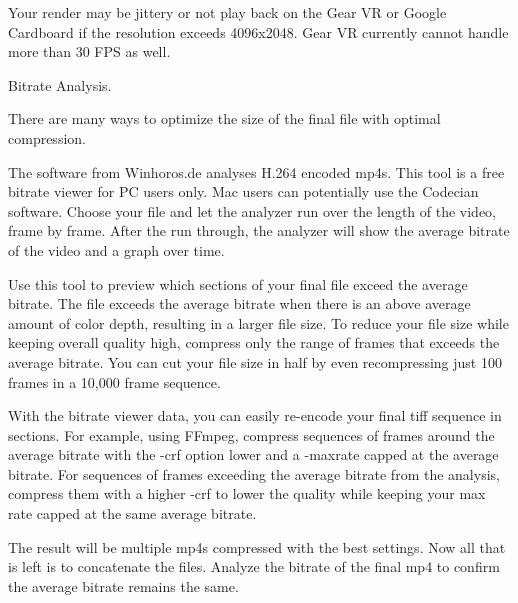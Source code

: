 \begin{fullwidth}
\tip Your render may be jittery or not play back on the Gear VR or Google Cardboard if the resolution exceeds 4096x2048. Gear VR currently cannot handle more than 30 FPS as well.

{\large Bitrate Analysis. \par}

There are many ways to optimize the size of the final file with optimal compression. 

The software from Winhoros.de analyses H.264 encoded mp4s. This tool is a free bitrate viewer for PC users only. Mac users can potentially use the Codecian software. Choose your file and let the analyzer run over the length of the video, frame by frame. After the run through, the analyzer will show the average bitrate of the video and a graph over time. 

Use this tool to preview which sections of your final file exceed the average bitrate. The file exceeds the average bitrate when there is an above average amount of color depth, resulting in a larger file size. To reduce your file size while keeping overall quality high, compress only the range of frames that exceeds the average bitrate. You can cut your file size in half by even recompressing just 100 frames in a 10,000 frame sequence.

With the bitrate viewer data, you can easily re-encode your final tiff sequence in sections. For example, using FFmpeg, compress sequences of frames around the average bitrate with the -crf option lower and a -maxrate capped at the average bitrate. For sequences of frames exceeding the average bitrate from the analysis, compress them with a higher -crf to lower the quality while keeping your max rate capped at the same average bitrate.

The result will be multiple mp4s compressed with the best settings. Now all that is left is to concatenate the files. Analyze the bitrate of the final mp4 to confirm the average bitrate remains the same.


\clearpage
\end{fullwidth}